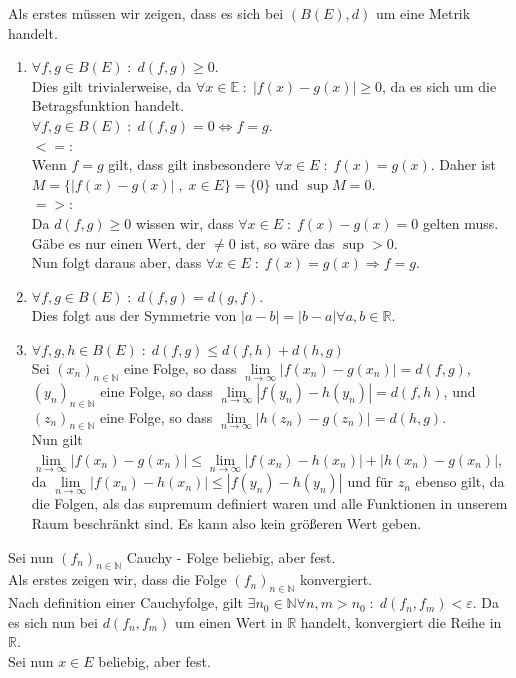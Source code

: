 Als erstes müssen wir zeigen, dass es sich bei $(B(E),d)$ um eine Metrik handelt.
\begin{enumerate}[1.]
    \item $\forall f,g \in B(E) \; : \; d(f,g) \geq 0$.\\
        Dies gilt trivialerweise, da $\forall x \in \mathbb{E} \; : \; |f(x) - g(x)| \geq 0$, da es sich um
        die Betragsfunktion handelt.\\
        $\forall f,g \in B(E) \; : \; d(f,g) = 0 \Leftrightarrow f = g$.\\
        $<=$:\\
            Wenn $f=g$ gilt, dass gilt insbesondere $\forall x \in E \; : \; f(x) = g(x)$.
            Daher ist $M = \{ |f(x) - g(x)| \; , \; x \in E\} = \{ 0 \}$ und $\sup M = 0$.\\
        $=>$:\\
            Da $d(f,g) \geq 0$ wissen wir, dass $\forall x \in E \; : \; f(x) - g(x) = 0$ gelten muss.
            Gäbe es nur einen Wert, der $\not= 0$ ist, so wäre das $\sup > 0$.\\
            Nun folgt daraus aber, dass $\forall x \in E \; : \; f(x) = g(x) \Rightarrow f = g$.
    \item $\forall f,g \in B(E) \; : \; d(f,g) = d(g,f)$.\\
        Dies folgt aus der Symmetrie von $|a - b| = |b - a| \forall a,b \in \mathbb{R}$.
    \item $\forall f,g,h \in B(E) \; : \; d(f,g) \leq d(f,h) + d(h,g)$\\
        Sei $(x_n)_{n\in\mathbb{N}}$ eine Folge, so dass $\underset{n \rightarrow \infty}{\lim} |f (x_n) - g(x_n)| = d(f,g)$,
        $(y_n)_{n\in\mathbb{N}}$ eine Folge, so dass $\underset{n \rightarrow \infty}{\lim} |f(y_n) - h (y_n)| = d(f,h)$,
        und $(z_n)_{n\in\mathbb{N}}$ eine Folge, so dass $\underset{n \rightarrow \infty}{\lim} |h (z_n) - g(z_n)| = d(h,g)$.\\

        Nun gilt $\underset{n \rightarrow \infty}{\lim} |f (x_n) - g (x_n) | \leq \underset{n \rightarrow \infty}{\lim} | f(x_n) - h (x_n) | + | h(x_n) - g(x_n)|$,
        da $\underset{n \rightarrow \infty}{\lim} |f(x_n) - h(x_n)| \leq |f(y_n) - h(y_n)|$ und für $z_n$ ebenso gilt, da die Folgen,
        als das supremum definiert waren und alle Funktionen in unserem Raum beschränkt sind. Es kann also kein größeren Wert geben.
\end{enumerate}

Sei nun $(f_n)_{n \in \mathbb{N}}$ Cauchy - Folge beliebig, aber fest.\\
Als erstes zeigen wir, dass die Folge $(f_n)_{n\in\mathbb{N}}$ konvergiert.\\
Nach definition einer Cauchyfolge, gilt $\exists n_0 \in \mathbb{N} \forall n,m > n_0 \; : \; d(f_n,f_m) < \varepsilon$.
Da es sich nun bei $d(f_n,f_m)$ um einen Wert in $\mathbb{R}$ handelt, konvergiert die Reihe in $\mathbb{R}$.\\

Sei nun $x \in E$ beliebig, aber fest.
